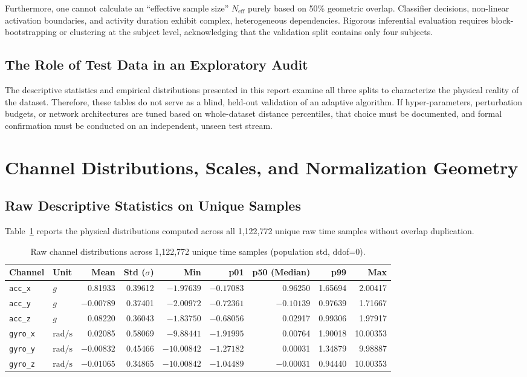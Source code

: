 \documentclass[11pt,a4paper]{article}
\newcommand{\code}[1]{{\small\ttfamily\nolinkurl{#1}}}
\theoremstyle{definition}
\begin{document}
Furthermore, one cannot calculate an ``effective sample size'' $N_{\text{eff}}$ purely based on 50\% geometric overlap. Classifier decisions, non-linear activation boundaries, and activity duration exhibit complex, heterogeneous dependencies. Rigorous inferential evaluation requires block-bootstrapping or clustering at the subject level, acknowledging that the validation split contains only four subjects.

\subsection{The Role of Test Data in an Exploratory Audit}
The descriptive statistics and empirical distributions presented in this report examine all three splits to characterize the physical reality of the dataset. Therefore, these tables do not serve as a blind, held-out validation of an adaptive algorithm. If hyper-parameters, perturbation budgets, or network architectures are tuned based on whole-dataset distance percentiles, that choice must be documented, and formal confirmation must be conducted on an independent, unseen test stream.

\section{Channel Distributions, Scales, and Normalization Geometry}

\subsection{Raw Descriptive Statistics on Unique Samples}
Table~\ref{tab:channel_stats} reports the physical distributions computed across all 1,122,772 unique raw time samples without overlap duplication.

\begin{table}[htbp]\centering\small
\begin{tabular}{llrrrrrrr}\toprule
Channel & Unit & Mean & Std ($\sigma$) & Min & p01 & p50 (Median) & p99 & Max\\\midrule
\code{acc_x} & $g$ & 0.81933 & 0.39612 & $-1.97639$ & $-0.17083$ & 0.96250 & 1.65694 & 2.00417\\
\code{acc_y} & $g$ & $-0.00789$ & 0.37401 & $-2.00972$ & $-0.72361$ & $-0.10139$ & 0.97639 & 1.71667\\
\code{acc_z} & $g$ & 0.08220 & 0.36043 & $-1.83750$ & $-0.68056$ & 0.02917 & 0.99306 & 1.97917\\
\code{gyro_x} & $\mathrm{rad/s}$ & 0.02085 & 0.58069 & $-9.88441$ & $-1.91995$ & 0.00764 & 1.90018 & 10.00353\\
\code{gyro_y} & $\mathrm{rad/s}$ & $-0.00832$ & 0.45466 & $-10.00842$ & $-1.27182$ & 0.00031 & 1.34879 & 9.98887\\
\code{gyro_z} & $\mathrm{rad/s}$ & $-0.01065$ & 0.34865 & $-10.00842$ & $-1.04489$ & $-0.00031$ & 0.94440 & 10.00353\\\bottomrule
\end{tabular}
\caption{Raw channel distributions across 1,122,772 unique time samples (population std, ddof=0).}\label{tab:channel_stats}
\end{table}
\end{document}
